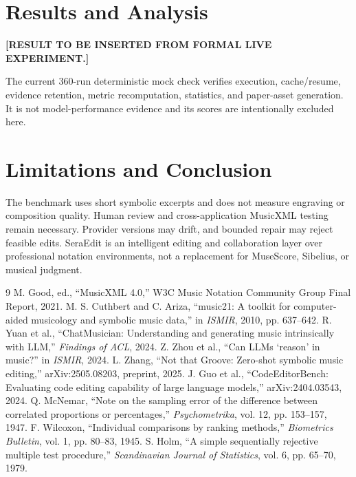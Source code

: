 \documentclass[9pt,twocolumn]{article}
\begin{document}
\section{Results and Analysis}
\textbf{[RESULT TO BE INSERTED FROM FORMAL LIVE EXPERIMENT.]}

The current 360-run deterministic mock check verifies execution, cache/resume, evidence retention, metric recomputation, statistics, and paper-asset generation. It is not model-performance evidence and its scores are intentionally excluded here.

\section{Limitations and Conclusion}
The benchmark uses short symbolic excerpts and does not measure engraving or composition quality. Human review and cross-application MusicXML testing remain necessary. Provider versions may drift, and bounded repair may reject feasible edits. SeraEdit is an intelligent editing and collaboration layer over professional notation environments, not a replacement for MuseScore, Sibelius, or musical judgment.

\begin{thebibliography}{9}
 M. Good, ed., ``MusicXML 4.0,'' W3C Music Notation Community Group Final Report, 2021.
 M. S. Cuthbert and C. Ariza, ``music21: A toolkit for computer-aided musicology and symbolic music data,'' in \emph{ISMIR}, 2010, pp. 637--642.
 R. Yuan et al., ``ChatMusician: Understanding and generating music intrinsically with LLM,'' \emph{Findings of ACL}, 2024.
 Z. Zhou et al., ``Can LLMs `reason' in music?'' in \emph{ISMIR}, 2024.
 L. Zhang, ``Not that Groove: Zero-shot symbolic music editing,'' arXiv:2505.08203, preprint, 2025.
 J. Guo et al., ``CodeEditorBench: Evaluating code editing capability of large language models,'' arXiv:2404.03543, 2024.
 Q. McNemar, ``Note on the sampling error of the difference between correlated proportions or percentages,'' \emph{Psychometrika}, vol. 12, pp. 153--157, 1947.
 F. Wilcoxon, ``Individual comparisons by ranking methods,'' \emph{Biometrics Bulletin}, vol. 1, pp. 80--83, 1945.
 S. Holm, ``A simple sequentially rejective multiple test procedure,'' \emph{Scandinavian Journal of Statistics}, vol. 6, pp. 65--70, 1979.
\end{thebibliography}
\end{document}
